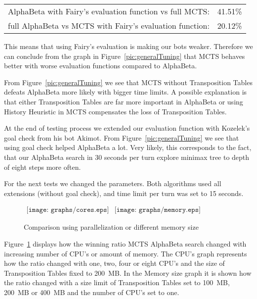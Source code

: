 \begin{center}
\begin{tabular}{rl}
AlphaBeta with Fairy's evaluation function vs full MCTS: & 41.51\% \\
full AlphaBeta vs MCTS with Fairy's evaluation function: & 20.12\% \\
\end{tabular}
\end{center}

\noindent This means that using Fairy's evaluation is making our bots weaker.
Therefore we can conclude from the graph in Figure~\ref{pic:generalTuning} that
MCTS behaves better with worse evaluation functions compared to AlphaBeta.

From Figure~\ref{pic:generalTuning} we see that MCTS without Transposition
Tables defeats AlphaBeta more likely with bigger time limits. A possible
explanation is that either Transposition Tables are far more important in
AlphaBeta or using History Heuristic in MCTS compensates the loss of
Transposition Tables.

At the end of testing process we extended our evaluation function with
Kozelek's goal check from his bot Akimot. From Figure~\ref{pic:generalTuning}
we see that using goal check helped AlphaBeta a lot. Very likely, this
corresponds to the fact, that our AlphaBeta search in 30 seconds per turn
explore minimax tree to depth of eight steps more often.

For the next tests we changed the parameters. Both algorithms used all extensions
(without goal check), and time limit per turn was set to 15 seconds. 

\begin{figure}[h]
	\begin{center}$
	\begin{array}{cc}
	\texttt{[image: graphs/cores.eps]} &
	\texttt{[image: graphs/memory.eps]}
	\end{array}$
	\end{center}
\caption{Comparison using parallelization or different memory size}
\label{pic:cpuAndMemory}
\end{figure}

Figure~\ref{pic:cpuAndMemory} displays how the winning ratio
MCTS AlphaBeta search changed with increasing number of CPU's or amount of
memory. The CPU's graph represents how the ratio changed with one,
two, four or eight CPU's and the size of Transposition Tables fixed to 200~MB.
In the Memory size graph it is shown how the ratio
changed with a size limit of Transposition Tables set to 100~MB, 200~MB or
400~MB and the number of CPU's set to one.

